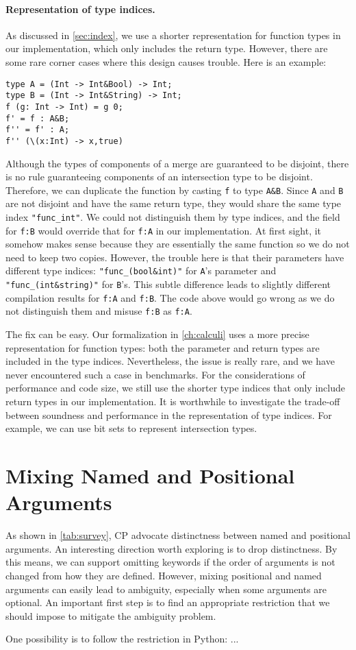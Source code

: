\paragraph{Representation of type indices.}
As discussed in \autoref{sec:index}, we use a shorter representation for
function types in our implementation, which only includes the return type.
However, there are some rare corner cases where this design causes trouble. Here
is an example:
\begin{lstlisting}
type A = (Int -> Int&Bool) -> Int;
type B = (Int -> Int&String) -> Int;
f (g: Int -> Int) = g 0;
f' = f : A&B;
f'' = f' : A;
f'' (\(x:Int) -> x,true)
\end{lstlisting}
Although the types of components of a merge are guaranteed to be disjoint, there
is no rule guaranteeing components of an intersection type to be disjoint.
Therefore, we can duplicate the function by casting \lstinline{f} to type
\lstinline{A&B}. Since \lstinline{A} and \lstinline{B} are not disjoint and have
the same return type, they would share the same type index
\lstinline{"func_int"}. We could not distinguish them by type indices, and the
field for \lstinline{f:B} would override that for \lstinline{f:A} in our
implementation. At first sight, it somehow makes sense because they are
essentially the same function so we do not need to keep two copies. However, the
trouble here is that their parameters have different type indices:
\lstinline{"func_(bool&int)"} for \lstinline{A}'s parameter and
\lstinline{"func_(int&string)"} for \lstinline{B}'s. This subtle difference
leads to slightly different compilation results for \lstinline{f:A} and
\lstinline{f:B}. The code above would go wrong as we do not distinguish them and
misuse \lstinline{f:B} as \lstinline{f:A}.

The fix can be easy. Our formalization in \autoref{ch:calculi} uses a more
precise representation for function types: both the parameter and return types
are included in the type indices. Nevertheless, the issue is really rare, and we
have never encountered such a case in benchmarks. For the considerations of
performance and code size, we still use the shorter type indices that only
include return types in our implementation. It is worthwhile to investigate the
trade-off between soundness and performance in the representation of type
indices. For example, we can use bit sets to represent intersection types.

\section{Mixing Named and Positional Arguments}

As shown in \autoref{tab:survey}, CP advocate distinctness between named and
positional arguments. An interesting direction worth exploring is to drop
distinctness. By this means, we can support omitting keywords if the order of
arguments is not changed from how they are defined. However, mixing positional
and named arguments can easily lead to ambiguity, especially when some arguments
are optional. An important first step is to find an appropriate restriction that
we should impose to mitigate the ambiguity problem.

One possibility is to follow the restriction in Python: ...
